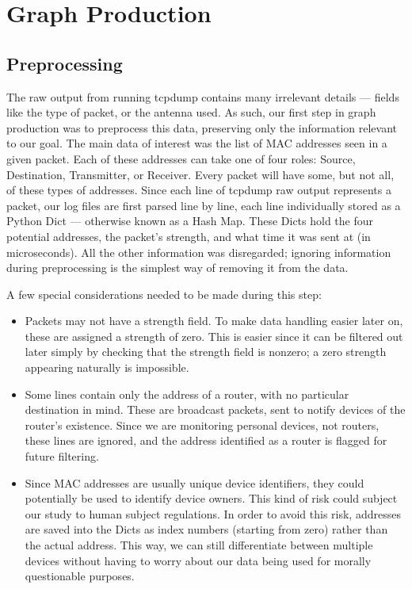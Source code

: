\section{Graph Production}

\subsection{Preprocessing}


The raw output from running tcpdump contains many irrelevant details --- fields like the type of packet, or the antenna used.
As such, our first step in graph production was to preprocess this data, preserving only the information relevant to our goal.
The main data of interest was the list of MAC addresses seen in a given packet.
Each of these addresses can take one of four roles: Source, Destination, Transmitter, or Receiver.
Every packet will have some, but not all, of these types of addresses.
Since each line of tcpdump raw output represents a packet, our log files are first parsed line by line, each line individually stored as a Python Dict --- otherwise known as a Hash Map.
These Dicts hold the four potential addresses, the packet's strength, and what time it was sent at (in microseconds).
All the other information was disregarded; ignoring information during preprocessing is the simplest way of removing it from the data.

A few special considerations needed to be made during this step:
\begin{itemize}
\item Packets may not have a strength field.
  To make data handling easier later on, these are assigned a strength of zero.
  This is easier since it can be filtered out later simply by checking that the strength field is nonzero; a zero strength appearing naturally is impossible. 
\item Some lines contain only the address of a router, with no particular destination in mind.
  These are broadcast packets, sent to notify devices of the router's existence.
  Since we are monitoring personal devices, not routers, these lines are ignored, and the address identified as a router is flagged for future filtering.
\item Since MAC addresses are usually unique device identifiers, they could potentially be used to identify device owners.
  This kind of risk could subject our study to human subject regulations.
  In order to avoid this risk, addresses are saved into the Dicts as index numbers (starting from zero) rather than the actual address.
  This way, we can still differentiate between multiple devices without having to worry about our data being used for morally questionable purposes.
\end{itemize}

